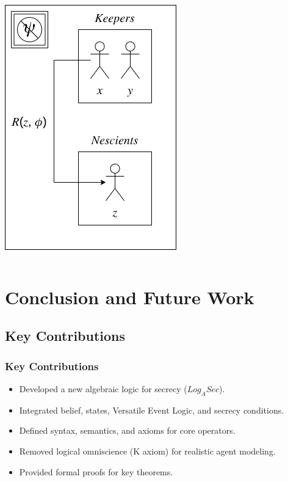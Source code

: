 \documentclass[aspectratio=169]{beamer}
\begin{document}
\begin{frame}
\begin{columns}[c]
\centering
\includegraphics[width=\linewidth]{images/s2.png}

\end{columns}

\end{frame}


\section{Conclusion and Future Work}

\subsection{Key Contributions}
\begin{frame}
\frametitle{Key Contributions}
\begin{itemize}
    \Large
    \item Developed a new algebraic logic for secrecy ($Log_ASec$).
    \item Integrated belief, states, Versatile Event Logic, and secrecy conditions.
    \item Defined syntax, semantics, and axioms for core operators.
    \item Removed logical omniscience (K axiom) for realistic agent modeling.
    \item Provided formal proofs for key theorems.
\end{itemize}
\end{frame}
\end{document}
